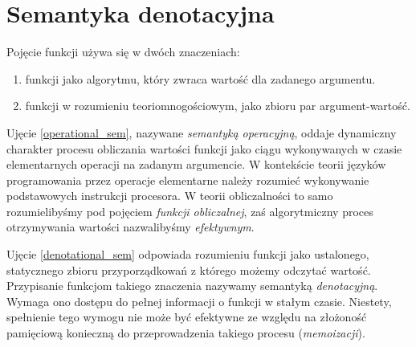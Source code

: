 \section{Semantyka denotacyjna}
Pojęcie funkcji używa się w dwóch znaczeniach:
\begin{enumerate}[label=(\alph*)]
\item funkcji jako algorytmu, który zwraca wartość dla zadanego argumentu.\label{operational_sem}
\item funkcji w rozumieniu teoriomnogościowym, jako zbioru par argument-wartość.
\label{denotational_sem}
\end{enumerate}

Ujęcie \ref{operational_sem}, nazywane \emph{semantyką operacyjną}, oddaje dynamiczny charakter procesu obliczania wartości funkcji jako ciągu wykonywanych w czasie elementarnych operacji na zadanym argumencie. W kontekście teorii języków programowania przez operacje elementarne należy rozumieć wykonywanie podstawowych instrukcji procesora. W teorii obliczalności to samo rozumielibyśmy pod pojęciem \emph{funkcji obliczalnej}, zaś algorytmiczny proces otrzymywania wartości nazwalibyśmy \emph{efektywnym}.

Ujęcie \ref{denotational_sem} odpowiada rozumieniu funkcji jako ustalonego, statycznego zbioru przyporządkowań z którego możemy odczytać wartość. Przypisanie funkcjom takiego znaczenia nazywamy semantyką \emph{denotacyjną}. Wymaga ono dostępu do pełnej informacji o funkcji w stałym czasie. Niestety, spełnienie tego wymogu nie może być efektywne ze względu na złożoność pamięciową konieczną do przeprowadzenia takiego procesu (\emph{memoizacji}).

